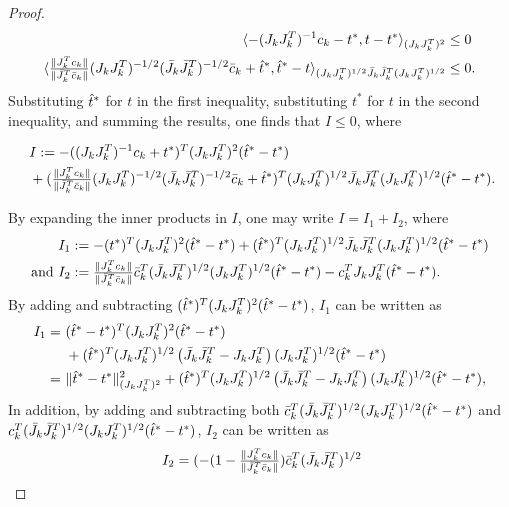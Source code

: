 \begin{proof}
  \begin{align*}
    \langle - (J_k J_k^T)^{-1} c_k - t^*, t - t^* \rangle_{(J_k J_k^T)^2} &\leq 0 \\
    \langle {\tfrac{\|J_k^Tc_k\|}{\|{\bar J}_k^T{\bar c}_k\|}} (J_k J_k^T)^{-1/2} ({\bar J}_k {\bar J}_k^T)^{-1/2} {\bar c}_k + {\hat t}^*,  {\hat t}^* - t \rangle_{(J_k J_k^T)^{1/2} {\bar J}_k {\bar J}_k^T (J_k J_k^T)^{1/2}} &\leq 0.
  \end{align*}
  Substituting ${\hat t}^*$ for $t$ in the first inequality, substituting $t^*$ for $t$ in the second inequality, and summing the results, one finds that $I \leq 0$, where
  \begin{samepage}
  \begin{align*}
    &\ I := - ((J_k J_k^T)^{-1} c_k + t^*)^T (J_k J_k^T)^2 ({\hat t}^* - t^*) \\
    &\ + ({\tfrac{\|J_k^Tc_k\|}{\|{\bar J}_k^T{\bar c}_k\|}} (J_k J_k^T)^{-1/2} ({\bar J}_k {\bar J}_k^T)^{-1/2}{\bar c}_k +  {\hat t}^*)^T (J_k J_k^T)^{1/2}  {\bar J}_k {\bar J}_k^T(J_k J_k^T)^{1/2} ({\hat t}^* - t^*).
  \end{align*}
  \end{samepage}
  By expanding the inner products in $I$, one may write $I = I_1 + I_2$, where 
  \begin{align*}
    I_1 &:= - (t^*)^T (J_k J_k^T)^2   (\that^* - t^*) +  (\that^*)^T  (J_k J_k^T)^{1/2}  \Jtrue_k \Jtrue_k^T (J_k J_k^T)^{1/2} (\that^* - t^*) \\ \text{and}\ 
    I_2 &:= \JCfrac \ctrue_k^T (\Jtrue_k \Jtrue_k^T)^{1/2} (J_k J_k^T)^{1/2} (\that^* - t^*)  - c_k^T J_k J_k^T (\that^* - t^*).
  \end{align*}
  By adding and subtracting $({\hat t}^*)^T (J_k J_k^T)^2 ({\hat t}^* - t^*)$, $I_1$ can be written as 
  \begin{align*}
  I_1
    =&\ ({\hat t}^* - t^*)^T (J_k J_k^T)^2  ({\hat t}^* - t^*) \nonumber \\
     &\ + ({\hat t}^*)^T (J_k J_k^T)^{1/2} \left( {\bar J}_k {\bar J}_k^T - J_k J_k^T \right) (J_k J_k^T)^{1/2} ({\hat t}^* - t^*) \nonumber \\ 
    =&\ \| {\hat t}^* - t^* \|_{(J_k J_k^T)^2}^2 +  ({\hat t}^*)^T (J_k J_k^T)^{1/2} \left( {\bar J}_k {\bar J}_k^T - J_k J_k^T \right) (J_k J_k^T)^{1/2} ({\hat t}^* - t^*),
  \end{align*}
  In addition, by adding and subtracting both ${\bar c}_k^T ({\bar J}_k {\bar J}_k^T)^{1/2} (J_k J_k^T)^{1/2} ({\hat t}^* - t^*)$ and $c_k^T ({\bar J}_k {\bar J}_k^T)^{1/2} (J_k J_k^T)^{1/2} ({\hat t}^* - t^*)$, $I_2$ can be written as
  \begin{align*}
    &\ I_2 = (-(1 - \JCfrac) \ctrue_k^T (\Jtrue_k \Jtrue_k^T)^{1/2} \nonumber \\

\end{align*}
\end{proof}
